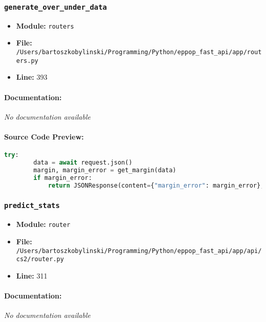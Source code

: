 \documentclass[11pt,a4paper]{article}
\begin{document}
\vspace{1em}
\subsubsection{\texttt{generate\_over\_under\_data}}

\begin{itemize}
    \item \textbf{Module:} \texttt{routers}
    \item \textbf{File:} \texttt{/Users/bartoszkobylinski/Programming/Python/eppop\_fast\_api/app/routers.py}
    \item \textbf{Line:} 393
\end{itemize}

\paragraph{Documentation:} \textit{No documentation available}

\paragraph{Source Code Preview:}
\begin{lstlisting}[language=Python]
    try:
        data = await request.json()
        margin, margin_error = get_margin(data)
        if margin_error:
            return JSONResponse(content={"margin_error": margin_error}, status_code=400)
\end{lstlisting}

\vspace{1em}
\subsubsection{\texttt{predict\_stats}}

\begin{itemize}
    \item \textbf{Module:} \texttt{router}
    \item \textbf{File:} \texttt{/Users/bartoszkobylinski/Programming/Python/eppop\_fast\_api/app/api/cs2/router.py}
    \item \textbf{Line:} 311
\end{itemize}

\paragraph{Documentation:} \textit{No documentation available}
\end{document}
